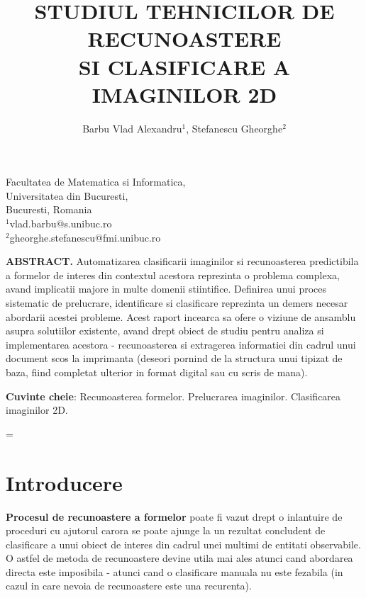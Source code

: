 \documentclass[10pt]{article}
\title{\renewcommand{\baselinestretch}{1.17}\normalsize\bf%
\uppercase{
	Studiul tehnicilor de recunoastere \\
	si clasificare a imaginilor 2D}
}
\author{
Barbu Vlad Alexandru$^{1}$, Stefanescu Gheorghe$^{2}$
}
\begin{document}
\date{}

\maketitle

\vspace{-0.5cm}

\begin{center}
{\footnotesize 
Facultatea de Matematica si Informatica, \\
Universitatea din Bucuresti, \\
Bucuresti, Romania \\
$^1$vlad.barbu@s.unibuc.ro \\
$^2$gheorghe.stefanescu@fmi.unibuc.ro \\
}
\end{center}

\bigskip
\noindent
{\small{\bf ABSTRACT.}
		Automatizarea clasificarii imaginilor si recunoasterea predictibila 
	a formelor de interes din contextul acestora reprezinta o problema complexa,
	avand implicatii majore in multe domenii stiintifice. Definirea unui
	proces sistematic de prelucrare, identificare si clasificare reprezinta
	un demers necesar abordarii acestei probleme. Acest raport incearca sa
	ofere o viziune de ansamblu asupra solutiilor existente, 
	avand drept obiect de studiu pentru analiza si implementarea acestora - recunoasterea 
	si extragerea informatiei din cadrul unui document scos la imprimanta (deseori pornind
	de la structura unui tipizat de baza, fiind completat ulterior in format digital
	sau cu scris de mana).
}

\medskip
\noindent
{\small{\bf Cuvinte cheie}{:} Recunoasterea formelor. Prelucrarea imaginilor. Clasificarea imaginilor 2D.
}

\baselineskip=\normalbaselineskip

\section{Introducere}\label{sec:1}

\> {\bf Procesul de recunoastere a formelor} poate fi vazut drept o inlantuire de proceduri cu ajutorul
carora se poate ajunge la un rezultat concludent de clasificare a unui obiect de
interes din cadrul unei multimi de entitati observabile. O astfel de metoda de recunoastere
devine utila mai ales atunci cand abordarea directa este imposibila - atunci cand o 
clasificare manuala nu este fezabila (in cazul in care nevoia de recunoastere este una recurenta).
\end{document}
